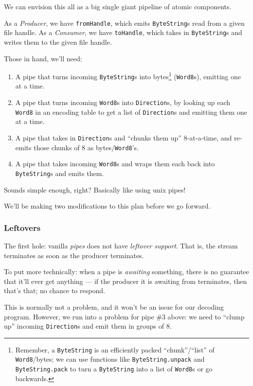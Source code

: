 \documentclass[]{article}
\begin{document}
We can envision this all as a big single giant pipeline of atomic components.

As a \emph{Producer}, we have \texttt{fromHandle}, which emits
\texttt{ByteString}s read from a given file handle. As a \emph{Consumer}, we
have \texttt{toHandle}, which takes in \texttt{ByteString}s and writes them to
the given file handle.

Those in hand, we'll need:

\begin{enumerate}
\def\labelenumi{\arabic{enumi}.}
\tightlist
\item
  A pipe that turns incoming \texttt{ByteString}s into bytes\footnote{Remember,
    a \texttt{ByteString} is an efficiently packed ``chunk''/``list'' of
    \texttt{Word8}/bytes; we can use functions like \texttt{ByteString.unpack}
    and \texttt{ByteString.pack} to turn a \texttt{ByteString} into a list of
    \texttt{Word8}s or go backwards.} (\texttt{Word8}s), emitting one at a time.
\item
  A pipe that turns incoming \texttt{Word8}s into \texttt{Direction}s, by
  looking up each \texttt{Word8} in an encoding table to get a list of
  \texttt{Direction}s and emitting them one at a time.
\item
  A pipe that takes in \texttt{Direction}s and ``chunks them up'' 8-at-a-time,
  and re-emits those chunks of 8 as bytes/\texttt{Word8}'s.
\item
  A pipe that takes incoming \texttt{Word8}s and wraps them each back into
  \texttt{ByteString}s and emits them.
\end{enumerate}

Sounds simple enough, right? Basically like using unix pipes!

We'll be making two modifications to this plan before we go forward.

\subsubsection{Leftovers}\label{leftovers}

The first hole: vanilla \emph{pipes} does not have \emph{leftover support}. That
is, the stream terminates as soon as the producer terminates.

To put more technically: when a pipe is \emph{awaiting} something, there is no
guarantee that it'll ever get anything --- if the producer it is awaiting from
terminates, then that's that; no chance to respond.

This is normally not a problem, and it won't be an issue for our decoding
program. However, we run into a problem for pipe \#3 above: we need to ``clump
up'' incoming \texttt{Direction}s and emit them in groups of 8.
\end{document}
